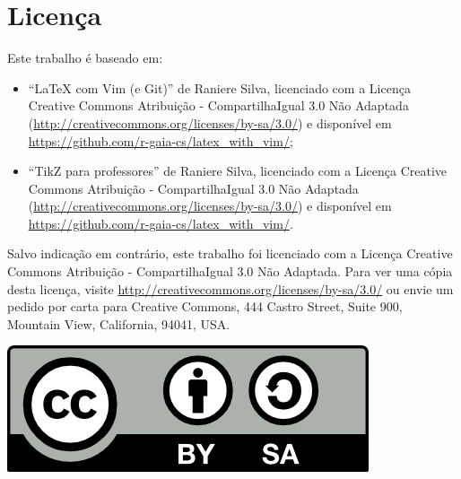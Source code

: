 % 
% 
% 
% 
% 
% 
%
%
\section*{Licen\c{c}a}

Este trabalho \'{e} baseado em:
\begin{itemize}
    \item ``LaTeX com Vim (e Git)'' de Raniere Silva, licenciado com a Licen\c{c}a Creative Commons Atribui\c{c}\~{a}o - CompartilhaIgual 3.0 N\~{a}o Adaptada (\url{http://creativecommons.org/licenses/by-sa/3.0/}) e dispon\'{i}vel em \url{https://github.com/r-gaia-cs/latex_with_vim/};
    \item ``TikZ para professores'' de Raniere Silva, licenciado com a Licen\c{c}a Creative Commons Atribui\c{c}\~{a}o - CompartilhaIgual 3.0 N\~{a}o Adaptada (\url{http://creativecommons.org/licenses/by-sa/3.0/}) e dispon\'{i}vel em \url{https://github.com/r-gaia-cs/latex_with_vim/}.
\end{itemize}

Salvo indica\c{c}\~{a}o em contr\'{a}rio, este trabalho foi licenciado com a Licen\c{c}a Creative Commons Atribui\c{c}\~{a}o - CompartilhaIgual 3.0 N\~{a}o Adaptada. Para ver uma c\'{o}pia desta licen\c{c}a, visite \url{http://creativecommons.org/licenses/by-sa/3.0/} ou envie um pedido por carta para Creative Commons, 444 Castro Street, Suite 900, Mountain View, California, 94041, USA.

\begin{center}
    \includegraphics[keepaspectratio=true]{../../figures/cc-by-sa.png}
\end{center}
